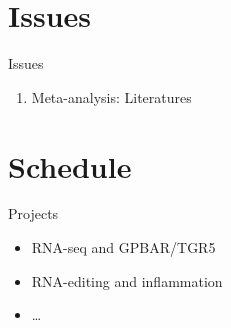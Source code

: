 \documentclass[
  5pt,
  ignorenonframetext,
]{beamer}
\providecommand{\tightlist}{%
  \setlength{\itemsep}{0pt}\setlength{\parskip}{0pt}}
\begin{document}
\hypertarget{issues}{%
\section{Issues}\label{issues}}

\begin{frame}{Issues}
\protect\hypertarget{issues-1}{}
\begin{enumerate}
\tightlist
\item
  Meta-analysis: Literatures
\end{enumerate}
\end{frame}

\hypertarget{schedule}{%
\section{Schedule}\label{schedule}}

\begin{frame}{Projects}
\protect\hypertarget{projects}{}
\begin{itemize}
\tightlist
\item
  RNA-seq and GPBAR/TGR5
\item
  RNA-editing and inflammation
\item
  \ldots{}
\end{itemize}
\end{frame}
\end{document}

